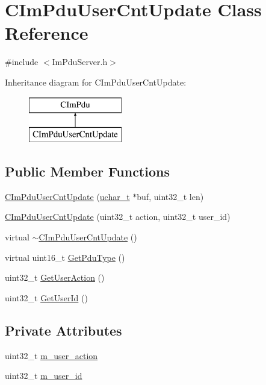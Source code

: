 \hypertarget{class_c_im_pdu_user_cnt_update}{}\section{C\+Im\+Pdu\+User\+Cnt\+Update Class Reference}
\label{class_c_im_pdu_user_cnt_update}


{\ttfamily \#include $<$Im\+Pdu\+Server.\+h$>$}

Inheritance diagram for C\+Im\+Pdu\+User\+Cnt\+Update\+:\begin{figure}[H]
\begin{center}
\leavevmode
\includegraphics[height=2.000000cm]{class_c_im_pdu_user_cnt_update}
\end{center}
\end{figure}
\subsection*{Public Member Functions}
\begin{DoxyCompactItemize}
\item 
\hyperlink{class_c_im_pdu_user_cnt_update_acfeb18b5fc8f263c710b0d90479fa4d8}{C\+Im\+Pdu\+User\+Cnt\+Update} (\hyperlink{base_2ostype_8h_a124ea0f8f4a23a0a286b5582137f0b8d}{uchar\+\_\+t} $\ast$buf, uint32\+\_\+t len)
\item 
\hyperlink{class_c_im_pdu_user_cnt_update_a7d6354ed3d9f726950ba014872df074e}{C\+Im\+Pdu\+User\+Cnt\+Update} (uint32\+\_\+t action, uint32\+\_\+t user\+\_\+id)
\item 
virtual \hyperlink{class_c_im_pdu_user_cnt_update_a9ada64f41066c6367f4740147de7f72d}{$\sim$\+C\+Im\+Pdu\+User\+Cnt\+Update} ()
\item 
virtual uint16\+\_\+t \hyperlink{class_c_im_pdu_user_cnt_update_a2ab74bd39716e12a5c59752be29a48a5}{Get\+Pdu\+Type} ()
\item 
uint32\+\_\+t \hyperlink{class_c_im_pdu_user_cnt_update_a3f0ef5fb483253902682329d7b7f5355}{Get\+User\+Action} ()
\item 
uint32\+\_\+t \hyperlink{class_c_im_pdu_user_cnt_update_a0ed872c5881b8f8d8c45781bf6ded63c}{Get\+User\+Id} ()
\end{DoxyCompactItemize}
\subsection*{Private Attributes}
\begin{DoxyCompactItemize}
\item 
uint32\+\_\+t \hyperlink{class_c_im_pdu_user_cnt_update_a795b5af9e14a3deae67ec35f0e1c815c}{m\+\_\+user\+\_\+action}
\item 
uint32\+\_\+t \hyperlink{class_c_im_pdu_user_cnt_update_a7b82909952d0419c35209082b28601dd}{m\+\_\+user\+\_\+id}
\end{DoxyCompactItemize}
